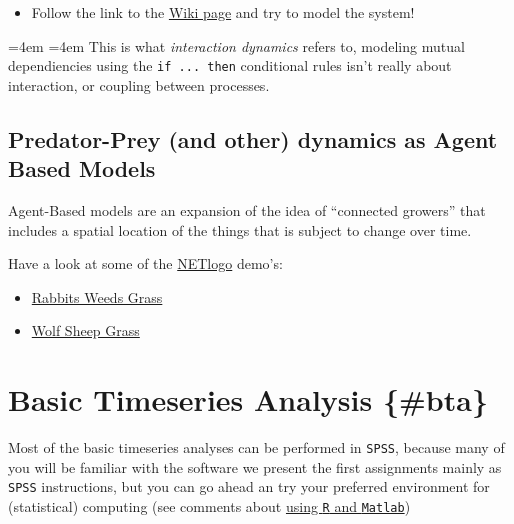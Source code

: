 \documentclass[]{book}
\providecommand{\tightlist}{%
  \setlength{\itemsep}{0pt}\setlength{\parskip}{0pt}}
\renewenvironment{quote}{%
  \par \small \medskip \block
  \leftskip=4em \rightskip=4em%
  \noindent \ignorespaces}{%
  \par \medskip
  }
\let\stdsection\section
\renewcommand\section{\newpage\stdsection}
\begin{document}
\begin{itemize}
\tightlist
\item
  Follow the link to the
  \href{https://en.wikipedia.org/wiki/Competitive_Lotka???Volterra_equations}{Wiki
  page} and try to model the system!
\end{itemize}

\begin{quote}
This is what \emph{interaction dynamics} refers to, modeling mutual
dependiencies using the \texttt{if\ ...\ then} conditional rules isn't
really about interaction, or coupling between processes.
\end{quote}

\section{\texorpdfstring{\textbf{Predator-Prey (and other) dynamics as
Agent Based
Models}}{Predator-Prey (and other) dynamics as Agent Based Models}}\label{predator-prey-and-other-dynamics-as-agent-based-models}

Agent-Based models are an expansion of the idea of ``connected growers''
that includes a spatial location of the things that is subject to change
over time.

Have a look at some of the
\href{http://ccl.northwestern.edu/netlogo/}{NETlogo} demo's:

\begin{itemize}
\tightlist
\item
  \href{http://www.netlogoweb.org/launch\#http://www.netlogoweb.org/assets/modelslib/Sample\%20Models/Biology/Rabbits\%20Grass\%20Weeds.nlogo}{Rabbits
  Weeds Grass}
\item
  \href{http://www.netlogoweb.org/launch\#http://www.netlogoweb.org/assets/modelslib/Sample\%20Models/Biology/Wolf\%20Sheep\%20Predation.nlogo}{Wolf
  Sheep Grass}
\end{itemize}

\chapter{\texorpdfstring{\textbf{Basic Timeseries Analysis
\{\#bta\}}}{Basic Timeseries Analysis \{\#bta\}}}\label{basic-timeseries-analysis-bta}

Most of the basic timeseries analyses can be performed in \texttt{SPSS},
because many of you will be familiar with the software we present the
first assignments mainly as \texttt{SPSS} instructions, but you can go
ahead an try your preferred environment for (statistical) computing (see
comments about \protect\hyperlink{bTSAinR}{using \texttt{R} and
\texttt{Matlab}})
\end{document}
